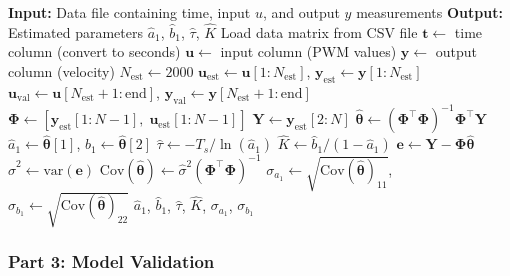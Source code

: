 \begin{algorithm}
\caption{Least Squares Parameter Estimation}
\label{alg:sysid_estimation}
\begin{algorithmic}[1]
\State \textbf{Input:} Data file containing time, input $u$, and output $y$ measurements
\State \textbf{Output:} Estimated parameters $\hat{a}_1$, $\hat{b}_1$, $\hat{\tau}$, $\hat{K}$
\State
\State {}
\State Load data matrix from CSV file
\State $\mathbf{t} \gets$ time column (convert to seconds)
\State $\mathbf{u} \gets$ input column (PWM values)
\State $\mathbf{y} \gets$ output column (velocity)
\State
\State {}
\State $N_{\text{est}} \gets 2000$
\State $\mathbf{u}_{\text{est}} \gets \mathbf{u}[1:N_{\text{est}}]$, \quad $\mathbf{y}_{\text{est}} \gets \mathbf{y}[1:N_{\text{est}}]$
\State $\mathbf{u}_{\text{val}} \gets \mathbf{u}[N_{\text{est}}+1:\text{end}]$, \quad $\mathbf{y}_{\text{val}} \gets \mathbf{y}[N_{\text{est}}+1:\text{end}]$
\State
\State {}
\State $\boldsymbol{\Phi} \gets [\mathbf{y}_{\text{est}}[1:N-1], \; \mathbf{u}_{\text{est}}[1:N-1]]$
\State $\mathbf{Y} \gets \mathbf{y}_{\text{est}}[2:N]$
\State
\State {}
\State $\hat{\boldsymbol{\theta}} \gets (\boldsymbol{\Phi}^\top \boldsymbol{\Phi})^{-1} \boldsymbol{\Phi}^\top \mathbf{Y}$
\State $\hat{a}_1 \gets \hat{\boldsymbol{\theta}}[1]$, \quad $\hat{b}_1 \gets \hat{\boldsymbol{\theta}}[2]$
\State
\State {}
\State $\hat{\tau} \gets -T_s / \ln(\hat{a}_1)$
\State $\hat{K} \gets \hat{b}_1 / (1 - \hat{a}_1)$
\State
\State {}
\State $\mathbf{e} \gets \mathbf{Y} - \boldsymbol{\Phi} \hat{\boldsymbol{\theta}}$ 
\State $\hat{\sigma}^2 \gets \text{var}(\mathbf{e})$
\State $\text{Cov}(\hat{\boldsymbol{\theta}}) \gets \hat{\sigma}^2 (\boldsymbol{\Phi}^\top \boldsymbol{\Phi})^{-1}$
\State $\sigma_{a_1} \gets \sqrt{\text{Cov}(\hat{\boldsymbol{\theta}})_{11}}$, \quad $\sigma_{b_1} \gets \sqrt{\text{Cov}(\hat{\boldsymbol{\theta}})_{22}}$
\State
\State \Return $\hat{a}_1$, $\hat{b}_1$, $\hat{\tau}$, $\hat{K}$, $\sigma_{a_1}$, $\sigma_{b_1}$
\end{algorithmic}
\end{algorithm}

\subsubsection{Part 3: Model Validation}

